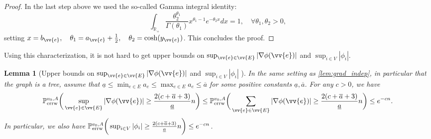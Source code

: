 \documentclass[a4paper, 11pt]{article}
\renewcommand{\P}{\mathbb{P}}
\newcommand{\Perrw}{\P_{\textnormal{errw}}}
\newtheorem{lem}[thm]{Lemma}
\begin{document}
\begin{proof}
In the last step above we used the so-called Gamma integral identity:
\begin{equation}    \label{eqn:gammaidentity}
\int_{\mathbb{R}_+} \frac{\theta_2^{\theta_1}}{\Gamma(\theta_1)}x^{\theta_1 -1} e^{-\theta_2 x} dx = 1, \quad \forall \theta_1,\theta_2>0,
\end{equation}
setting $x = b_{\vv{e}}, \quad \theta_1 = a_{\vv{e}} + \frac{1}{2}, \quad \theta_2 = \cosh(y_{\vv{e}})$.
This concludes the proof.
\end{proof}

Using this characterization, it is not hard to 
get upper bounds on $\sup_{\vv{e} \in \vv{E}} |\nabla\phi(\vv{e})|$ and $\sup_{i\in V}|\phi_i|$.

\begin{lem}[Upper bounds on $\sup_{\vv{e} \in \vv{E}} |\nabla\phi(\vv{e})|$ and $\sup_{i\in V}|\phi_i|$ ]
\label{lem:fluc_grad}
In the same setting as \cref{lem:grad_indep}, in particular that the graph is a tree, assume that $\underline{a}\leq \min_{e\in E} a_e\leq \max_{e\in E} a_e \leq \overline{a}$ for some positive constants $\underline{a}, \overline{a}$. For any $c>0$, we have
\[
\Perrw^{v_0,A}\bigg(\sup_{\vv{e} \in \vv{E}} |\nabla\phi(\vv{e})| \geq \frac{2(c+\overline{a}+3)}{\underline{a}}n\bigg) \leq \Perrw^{v_0,A}\bigg(\sum_{\vv{e} \in \vv{E}} |\nabla\phi(\vv{e})| \geq \frac{2(c+\overline{a}+3)}{\underline{a}}n\bigg) \leq e^{-cn}.
\]
In particular, we also have
$\Perrw^{v_0,A}\bigg(\sup_{i \in V} |\phi_i| \geq \frac{2(c+\overline{a}+3)}{\underline{a}}n\bigg) \leq e^{-cn}$.
\end{lem}
\end{document}
